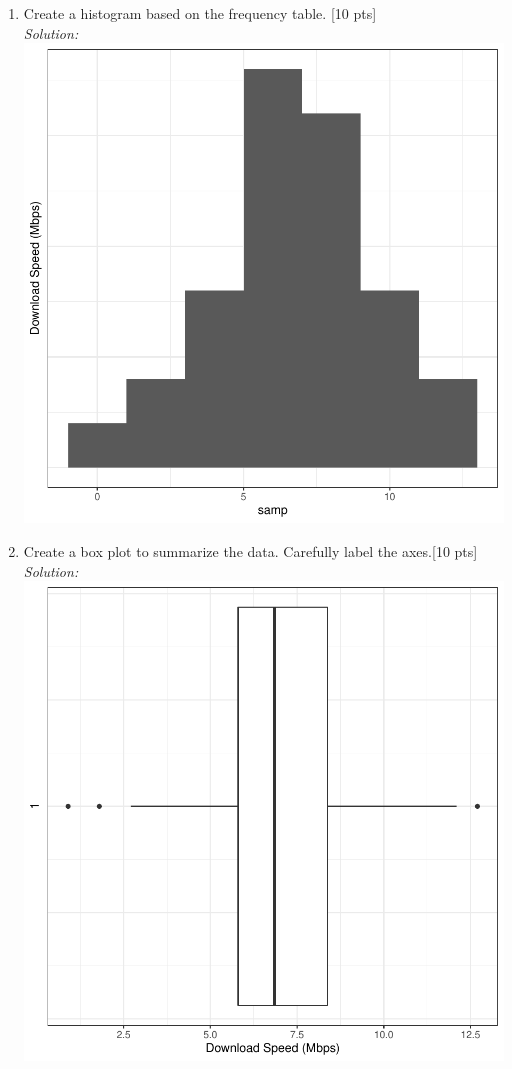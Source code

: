 \documentclass[11pt]{article}\usepackage[]{graphicx}\usepackage[]{color}
\begin{document}
\begin{enumerate}
\begin{enumerate}
  \pagebreak
  
  \item Create a histogram based on the frequency table. [10 pts]\\
  \emph{Solution:}
\includegraphics{stat305_hw2_sol-004}
  \item Create a box plot to summarize the data. Carefully label the axes.[10 pts]\\
  \emph{Solution:}
\includegraphics{stat305_hw2_sol-005}

\end{enumerate}
\end{enumerate}
\end{document}
